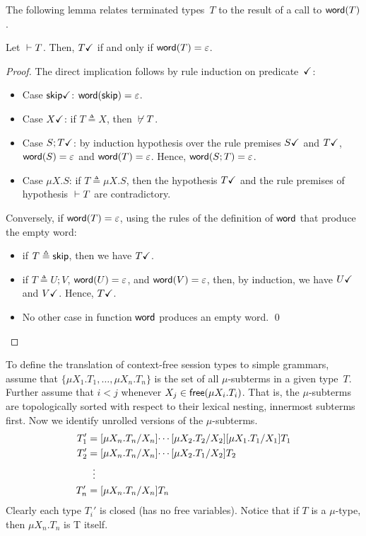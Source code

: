 The following lemma relates terminated types~$T$ to the result 
of a call to $\word(T)$. 

\begin{lemma}
  \label{lemma:terminated-togrammar}
  Let $\isType[] T$. Then, $\DONE T$ if and only if
  $\word(T) = \varepsilon$.
\end{lemma}
%
\begin{proof}
  The direct implication follows by rule induction on
  predicate~$\DONE$:
  \begin{itemize}
  \item Case $\DONE{\skipk}$: $\word(\skipk) = \varepsilon$.
  \item Case $\DONE{X}$: if $T\triangleq X$, then $\isNotType[]T$.
  \item Case $\DONE{S;T}$: by induction hypothesis over the 
    rule premises 
    $\DONE{S}$ and $\DONE{T}$,
    $\word(S) = \varepsilon$ and $\word(T) = \varepsilon$. Hence,
    $\word(S;T) = \varepsilon$.
  \item Case $\mu X.S$: if $T\triangleq \mu X.S$, then the hypothesis 
    $\DONE T$ and the rule premises of 
    hypothesis $\isType[]T$ are contradictory.
  \end{itemize}
  Conversely, if $\word(T) = \varepsilon$, using the rules of the definition of
  $\word$ that produce the empty word:
  \begin{itemize}
  \item if $T\triangleq \skipk$, then we have $\DONE T$.
  \item if $T\triangleq U;V$,
    $\word(U) = \varepsilon$, and $\word(V) = \varepsilon$, then, by
    induction, we have $\DONE U$ and $\DONE V$. Hence, $\DONE T$.
  \item No other case in function $\word$ produces an empty word. \qed
  \end{itemize}
\end{proof}



To define the translation of context-free session types to simple
grammars, assume that $\{\mu X_1.T_1,\dots,\mu X_n.T_n\}$ is the set
of all $\mu$-subterms in a given type~$T$. Further assume that $i<j$
whenever $X_j \in \free(\mu X_i.T_i)$. That is, the $\mu$-subterms are
topologically sorted with respect to their lexical nesting, innermost
subterms first.
%
Now we identify unrolled versions of the $\mu$-subterms.
%
\begin{align*}
  T_1' &= \subs{\mu X_n.T_n}{X_n}{ \cdots \subs{\mu X_2.T_2}{X_2}\subs{\mu X_1.T_1}{X_1}{T_1} }\\
  T_2' &= \subs{\mu X_n.T_n}{X_n}{ \cdots \subs{\mu X_2.T_1}{X_2}{T_2} }\\
       &\;\;\vdots \\
  T_n' &= \subs{\mu X_n.T_n}{X_n}{T_n} 
\end{align*}
%
Clearly each type $T_i'$ is closed (has no free variables).
Notice that if $T$ is a $\mu$-type, then $\mu X_n. T_n$ is T itself.


